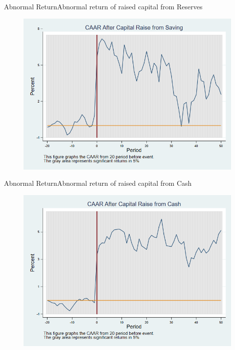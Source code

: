 \documentclass{beamer}
\begin{document}
\begin{frame}{Abnormal Return}{Abnormal return of raised capital from Reserves}
\label{abreturnsaving}
\begin{figure}
\centering
\includegraphics[width=0.65\linewidth]{Output/CARSaving.png}
\label{fig:abreturnsaving}
\end{figure}

\hfill\hyperlink{abreturnsaving4Factor}{}
\end{frame}




\begin{frame}{Abnormal Return}{Abnormal return of raised capital from Cash}
\label{abreturncash}
\begin{figure}
\centering
\includegraphics[width=0.65\linewidth]{Output/CARCash.png}
\label{fig:abreturncash}
\end{figure}
\hfill\hyperlink{abreturncash4Factor}{}
\end{frame}
\end{document}
